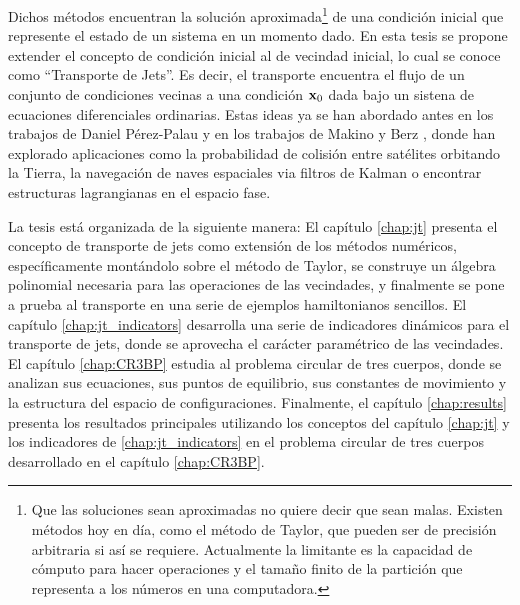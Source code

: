 Dichos métodos encuentran la solución aproximada\footnote{Que las soluciones sean aproximadas no quiere decir que sean malas. Existen métodos hoy en día, como el método de Taylor, que pueden ser de precisión arbitraria si así se requiere. Actualmente la limitante es la capacidad de cómputo para hacer operaciones y el tamaño finito de la partición que representa a los números en una computadora.} de una condición inicial que represente el estado de un sistema en un momento dado. En esta tesis se propone extender el concepto de condición inicial al de vecindad inicial, lo cual se conoce como ``Transporte de Jets''. Es decir, el transporte encuentra el flujo de un conjunto de condiciones vecinas a una condición $\mathbf{x}_0$ dada bajo un sistena de ecuaciones diferenciales ordinarias. Estas ideas ya se han abordado antes en los trabajos de Daniel Pérez-Palau \cite{Daniel2015, Perez2013, Perez2015} y en los trabajos de Makino y Berz \cite{Berz1991,Berz1998}, donde han explorado aplicaciones como la probabilidad de colisión entre satélites orbitando la Tierra, la navegación de naves espaciales via filtros de Kalman o  encontrar estructuras lagrangianas en el espacio fase.

La tesis está organizada de la siguiente manera: El capítulo \ref{chap:jt} presenta el concepto de transporte de jets como extensión de los métodos numéricos, específicamente montándolo sobre el método de Taylor, se construye un álgebra polinomial necesaria para las operaciones de las vecindades, y finalmente se pone a prueba al transporte en una serie de ejemplos hamiltonianos sencillos. El capítulo \ref{chap:jt_indicators} desarrolla una serie de indicadores dinámicos para el transporte de jets, donde se aprovecha el carácter paramétrico de las vecindades. El capítulo \ref{chap:CR3BP} estudia al problema circular de tres cuerpos, donde se analizan sus ecuaciones, sus puntos de equilibrio, sus constantes de movimiento y la estructura del espacio de configuraciones. Finalmente, el capítulo \ref{chap:results} presenta los resultados principales utilizando los conceptos del capítulo \ref{chap:jt} y los indicadores de \ref{chap:jt_indicators} en el problema circular de tres cuerpos desarrollado en el capítulo \ref{chap:CR3BP}. 


